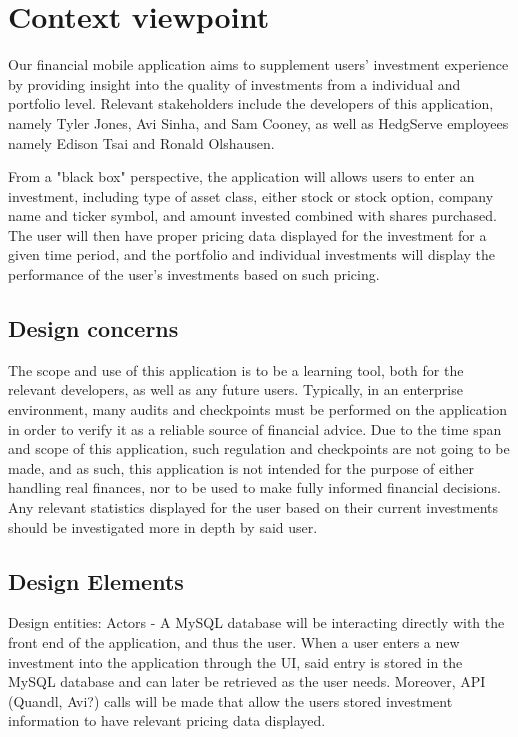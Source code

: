 \documentclass[onecolumn, draftclsnofoot,10pt, compsoc]{IEEEtran}
\begin{document}
\section{Context viewpoint}
Our financial mobile application aims to supplement users' investment experience by providing insight into the quality of investments from a individual and portfolio level. Relevant stakeholders include the developers of this application, namely Tyler Jones, Avi Sinha, and Sam Cooney, as well as HedgServe employees namely Edison Tsai and Ronald Olshausen.

From a "black box" perspective, the application will allows users to enter an investment, including type of asset class, either stock or stock option, company name and ticker symbol, and amount invested combined with shares purchased. The user will then have proper pricing data displayed for the investment for a given time period, and the portfolio and individual investments will display the performance of the user's investments based on such pricing.

\subsection{Design concerns}
The scope and use of this application is to be a learning tool, both for the relevant developers, as well as any future users. Typically, in an enterprise environment, many audits and checkpoints must be performed on the application in order to verify it as a reliable source of financial advice. Due to the time span and scope of this application, such regulation and checkpoints are not going to be made, and as such, this application is not intended for the purpose of either handling real finances, nor to be used to make fully informed financial decisions. Any relevant statistics displayed for the user based on their current investments should be investigated more in depth by said user.

\subsection{Design Elements}
Design entities: Actors - A MySQL database will be interacting directly with the front end of the application, and thus the user. When a user enters a new investment into the application through the UI, said entry is stored in the MySQL database and can later be retrieved as the user needs. Moreover, API (Quandl, Avi?) calls will be made that allow the users stored investment information to have relevant pricing data displayed.
\end{document}

